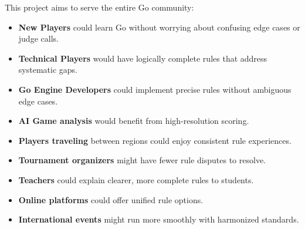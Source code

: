 \documentclass[11pt]{article}
\begin{document}
This project aims to serve the entire Go community:
\begin{itemize}
\item \textbf{New Players} could learn Go without worrying about confusing edge cases or judge calls.
\item \textbf{Technical Players} would have logically complete rules that address systematic gaps.
\item \textbf{Go Engine Developers} could implement precise rules without ambiguous edge cases.
\item \textbf{AI Game analysis} would benefit from high-resolution scoring.
\item \textbf{Players traveling} between regions could enjoy consistent rule experiences.
\item \textbf{Tournament organizers} might have fewer rule disputes to resolve.
\item \textbf{Teachers} could explain clearer, more complete rules to students.
\item \textbf{Online platforms} could offer unified rule options.
\item \textbf{International events} might run more smoothly with harmonized standards.
\end{itemize}
\end{document}
